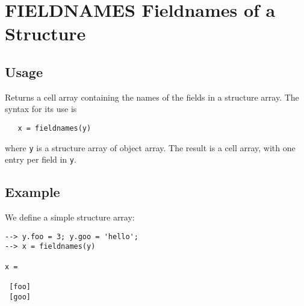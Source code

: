 \section{FIELDNAMES Fieldnames of a Structure}

\subsection{Usage}

Returns a cell array containing the names of the fields in
a structure array.  The syntax for its use is
\begin{verbatim}
   x = fieldnames(y)
\end{verbatim}
where \verb|y| is a structure array of object array.  The result
is a cell array, with one entry per field in \verb|y|.
\subsection{Example}

We define a simple structure array:
\begin{verbatim}
--> y.foo = 3; y.goo = 'hello';
--> x = fieldnames(y)

x = 

 [foo] 
 [goo] 
\end{verbatim}
